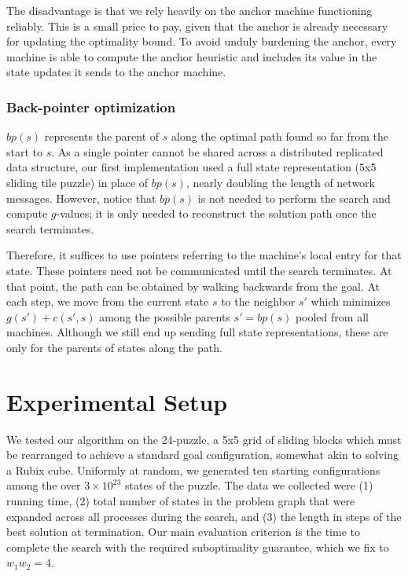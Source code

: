 \documentclass[11pt]{article}
\begin{document}
The disadvantage is that we rely heavily on the anchor machine functioning reliably. This is a small price to pay, given that the anchor is already necessary for updating the optimality bound. To avoid unduly burdening the anchor, every machine is able to compute the anchor heuristic and includes its value in the state updates it sends to the anchor machine.

\subsubsection*{Back-pointer optimization}

$bp(s)$ represents the parent of $s$ along the optimal path found so far from the start to $s$. As a single pointer cannot be shared across a distributed replicated data structure, our first implementation used a full state representation (5x5 sliding tile puzzle) in place of $bp(s)$, nearly doubling the length of network messages. However, notice that $bp(s)$ is not needed to perform the search and compute $g$-values; it is only needed to reconstruct the solution path once the search terminates.

Therefore, it suffices to use pointers referring to the machine's local entry for that state. These pointers need not be communicated until the search terminates. At that point, the path can be obtained by walking backwards from the goal. At each step, we move from the current state $s$ to the neighbor $s'$ which minimizes $g(s') + c(s',s)$ among the possible parents $s'=bp(s)$ pooled from all machines. Although we still end up sending full state representations, these are only for the parents of states along the path.


\section{Experimental Setup}

We tested our algorithm on the 24-puzzle, a 5x5 grid of sliding blocks which must be rearranged to achieve a standard goal configuration, somewhat akin to solving a Rubix cube. Uniformly at random, we generated ten starting configurations among the over $3\times 10^{23}$ states of the puzzle. The data we collected were (1) running time, (2) total number of states in the problem graph that were expanded across all processes during the search, and (3) the length in steps of the best solution at termination. Our main evaluation criterion is the time to complete the search with the required suboptimality guarantee, which we fix to $w_1 w_2 = 4$.
\end{document}
